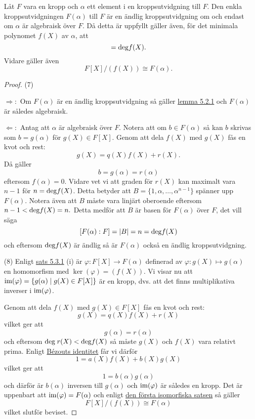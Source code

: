 \documentclass{article}
\newcommand{\grad}[0]{\textnormal{deg}}
\newcommand{\im}[0]{\textnormal{im}}
\theoremstyle{definition}
\begin{document}
\hypertarget{5.3.2}{}
\begin{mytheo}{}{}
  Låt $F$ vara en kropp och $\alpha$ ett element i en kroppsutvidgning till $F$. Den enkla kroppsutvidgningen $F(\alpha)$ till $F$ är en 
  ändlig kroppsutvidgning om och endast om $\alpha$ är algebraisk över $F$. Då detta är uppfyllt gäller även, för det minimala polynomet $f(X)$ av $\alpha$, att
  \begin{equation}
    [F(\alpha) : F] = \grad f(X).
  \end{equation}
  Vidare gäller även 
  \begin{equation}
    F[X]/(f(X)) \cong F(\alpha).
  \end{equation}
\end{mytheo}
\begin{proof}
  (7) 
  
  $\Rightarrow:$ Om $F(\alpha)$ är en ändlig kroppsutvidgning så gäller \hyperlink{algebraiskkropp}{lemma 5.2.1} och $F(\alpha)$ är således algebraisk. 
  
  $\Leftarrow:$ Antag att $\alpha$ är algebraisk över $F$. Notera att om $b \in F(\alpha)$ så kan $b$ skrivas som $b = g(\alpha)$ för $g(X) \in F[X].$
  Genom att dela $f(X)$ med $g(X)$ fås en kvot och rest: 
  \[g(X) = q(X)f(X) + r(X).\]
  Då gäller 
  \[b = g(\alpha) = r(\alpha)\]
  eftersom $f(\alpha) = 0$. Vidare vet vi att graden för $r(X)$ kan maximalt vara $n-1$ för $n = \grad f(X)$. Detta betyder att $B = \{1, \alpha, \ldots, \alpha^{n-1}\}$
  spänner upp $F(\alpha)$. Notera även att $B$ måste vara linjärt oberoende eftersom $n-1 < \grad f(X) = n.$ Detta medför att $B$ är basen för $F(\alpha)$ över $F$, 
  det vill säga 
  \[ [F(\alpha): F] = |B| = n = \grad f(X) \]
  och eftersom $\grad f(X)$ är ändlig så är $F(\alpha)$ också en ändlig kroppsutvidgning. 

  (8) Enligt \hyperlink{minpol}{sats 5.3.1} (i) är $\varphi: F[X] \rightarrow F(\alpha)$ definerad av $\varphi: g(X) \mapsto g(\alpha)$ 
  en homomorfism med $\ker(\varphi) = (f(X)).$ Vi visar nu att $\im(\varphi) = \{g(\alpha) \; | \; g(X) \in F[X]\}$ är en kropp, 
  dvs. att det finns multiplikativa inverser i $\im(\varphi)$. 

  Genom att dela $f(X)$ med $g(X) \in F[X]$ fås en kvot och rest: 
  \[g(X) = q(X)f(X) + r(X)\]
  vilket ger att 
  \[g(\alpha) = r(\alpha)\]
  och eftersom $\grad \; r(X) < \grad f(X)$ så måste $g(X)$ och $f(X)$ vara relativt prima. Enligt \hyperlink{Bézouts identitet}{Bézouts identitet}
  får vi därför 
  \[1 = a(X)f(X) + b(X)g(X)\]
  vilket ger att 
  \[1 = b(\alpha)g(\alpha)\]
  och därför är $b(\alpha)$ inversen till $g(\alpha)$ och $\im(\varphi)$ är således en kropp. Det är uppenbart att $\im(\varphi) = F(\alpha)$
  och enligt \hyperlink{isomorfiska}{den första isomorfiska satsen} så gäller 
  \[F[X]/(f(X)) \cong F(\alpha)\]
  vilket slutför beviset.
\end{proof}
\end{document}

